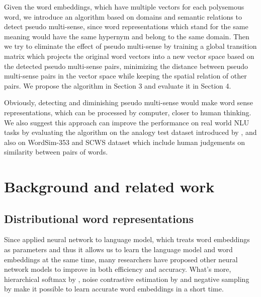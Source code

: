 \documentclass[11pt]{article}
\begin{document}
\par
Given the word embeddings, which have multiple vectors for each polysemous word, we introduce an algorithm based on domains and semantic relations to detect pseudo multi-sense, since word representations which stand for the same meaning would have the same hypernym and belong to the same domain. Then we try to eliminate the effect of pseudo multi-sense by training a global transition matrix which projects the original word vectors into a new vector space based on the detected pseudo multi-sense pairs, minimizing the distance between pseudo multi-sense pairs in the vector space while keeping the spatial relation of other pairs. We propose the algorithm in Section 3 and evaluate it in Section 4.
\par
Obviously, detecting and diminishing pseudo multi-sense would make word sense representations, which can be processed by computer, closer to human thinking. We also suggest this approach can improve the performance on real world NLU tasks by evaluating the algorithm on the analogy test dataset introduced by , and also on WordSim-353 \cite{finkelstein2001placing} and SCWS \cite{huang2012improving} dataset which include human judgements on similarity between pairs of words.


\section{Background and related work}
\subsection{Distributional word representations}
Since  applied neural network to language model, which treats word embeddings as parameters and thus it allows us to learn the language model and word embeddings at the same time, many researchers have proposed other neural network models \cite{mnih2007three, collobert2008unified, mikolov2013efficient} to improve in both efficiency and accuracy. What's more, hierarchical softmax by , noise contrastive estimation by  and negative sampling by  make it possible to learn accurate word embeddings in a short time.
\end{document}
